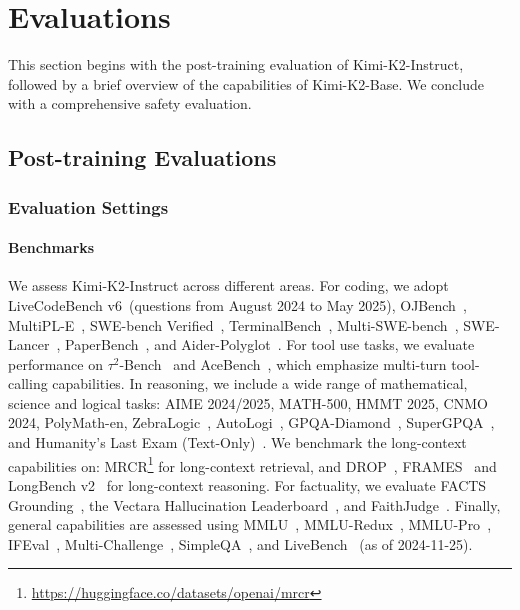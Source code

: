 \section{Evaluations}


This section begins with the post-training evaluation of Kimi-K2-Instruct, followed by a brief overview of the capabilities of Kimi-K2-Base. We conclude with a comprehensive safety evaluation.


\subsection{Post-training Evaluations}



\subsubsection{Evaluation Settings}


\paragraph{Benchmarks}
We assess Kimi-K2-Instruct across different areas.
For coding, we adopt LiveCodeBench v6~\citep{jain2024livecodebench}(questions from August 2024 to May 2025), OJBench~\citep{wang2025ojbenchcompetitionlevelcode}, MultiPL-E~\citep{10103177}, SWE-bench Verified~\citep{jimenez2024swebench,yang2025swesmith}, TerminalBench~\citep{tbench_2025}, Multi-SWE-bench~\citep{zan2025multi}, SWE-Lancer~\citep{miserendino2025swelancer}, PaperBench~\citep{starace2025paperbench}, and Aider-Polyglot~\citep{aider}. 
For tool use tasks, we evaluate performance on $\tau^2$-Bench~\citep{barres2025tau2} and AceBench~\citep{chen2025acebench}, which emphasize multi-turn tool-calling capabilities.
In reasoning, we include a wide range of mathematical, science and logical tasks: AIME 2024/2025, MATH-500, HMMT 2025, CNMO 2024, PolyMath-en, ZebraLogic~\citep{lin2025zebralogicscalinglimitsllms}, AutoLogi~\citep{zhu2025autologiautomatedgenerationlogic}, GPQA-Diamond~\citep{rein2024gpqa}, SuperGPQA~\citep{du2025supergpqa}, and Humanity's Last Exam (Text-Only)~\citep{phan2025humanitysexam}.
We benchmark the long-context capabilities on:  MRCR\footnote{\url{https://huggingface.co/datasets/openai/mrcr}} for long-context retrieval, and  DROP~\citep{DBLP:journals/corr/abs-1903-00161}, FRAMES~\citep{krishna2025factfetchreasonunified}  and  LongBench v2~\citep{bai2025longbenchv2deeperunderstanding} for  long-context reasoning.
For factuality, we evaluate FACTS Grounding~\citep{jacovi2025factsgroundingleaderboardbenchmarking}, the Vectara Hallucination Leaderboard~\citep{hhem-2.1-open}, and FaithJudge~\citep{tamber2025benchmarking}.
Finally, general capabilities are assessed using MMLU~\citep{hendrycks2021measuringmassivemultitasklanguage}, MMLU-Redux~\citep{gema2024we}, MMLU-Pro~\citep{wang2024mmluprorobustchallengingmultitask}, IFEval~\citep{Zhou2023InstructionFollowingEF}, Multi-Challenge~\citep{sirdeshmukh2025multichallengerealisticmultiturnconversation}, SimpleQA~\citep{wei2024measuring}, and LiveBench~\citep{livebench} (as of 2024-11-25).


